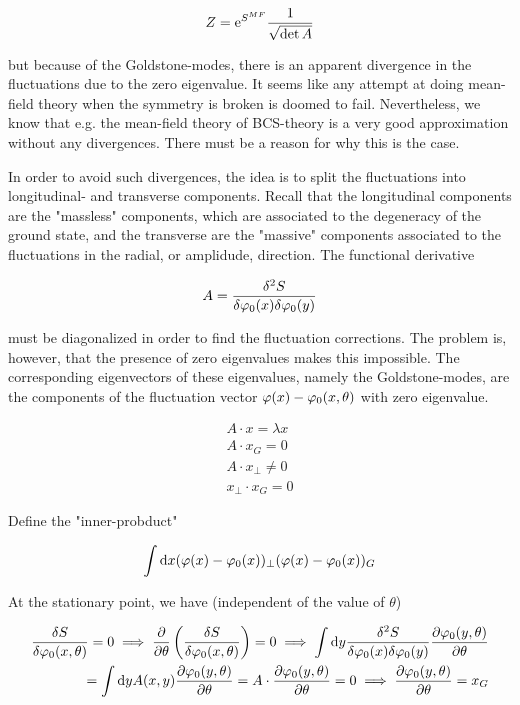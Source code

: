 \begin{align*}
    Z = \mathrm{e}^{S^{MF}} \frac{1}{\sqrt{\det A}}
\end{align*}

but because of the Goldstone-modes, there is an apparent divergence in the fluctuations due to the zero eigenvalue. It seems like any attempt at doing mean-field theory when the symmetry is broken is doomed to fail. Nevertheless, we know that e.g. the mean-field theory of BCS-theory is a very good approximation without any divergences. There must be a reason for why this is the case.  

In order to avoid such divergences, the idea is to split the fluctuations into longitudinal- and transverse components. Recall that the longitudinal components are the "massless" components, which are associated to the degeneracy of the ground state, and the transverse are the "massive" components associated to the fluctuations in the radial, or amplidude, direction. The functional derivative 

\begin{equation*}
    A = \fdv{^2S}{\p_0(x) \delta \p_0(y)}
\end{equation*}

must be diagonalized in order to find the fluctuation corrections. The problem is, however, that the presence of zero eigenvalues makes this impossible. The corresponding eigenvectors of these eigenvalues, namely the Goldstone-modes, are the components of the fluctuation vector $\varphi(x) - \varphi_0(x,\theta)$ with zero eigenvalue.  

\begin{align*}
    A \cdot x = \lambda x \\ 
    A \cdot x_G = 0 \\ 
    A \cdot x_{\perp} \neq 0 \\ 
    x_{\perp} \cdot x_G = 0
\end{align*}

Define the "inner-probduct" 

\begin{align*}
    \int \dd x (\varphi(x) - \varphi_0(x))_{\perp} (\varphi(x) - \varphi_0(x))_G
\end{align*}

At the stationary point, we have (independent of the value of $\theta$) 

\begin{align*}
    \fdv{S}{\p_0(x,\theta)} = 0 \implies \pdv{}{\theta} \left(\fdv{S}{\p_0(x,\theta)}  \right) = 0 
    \implies \int \dd y \fdv{^2S}{\p_0(x) \delta \p_0(y)} \pdv{\p_0(y,\theta)}{\theta} \\ 
    = \int \dd y A(x,y)\pdv{\p_0(y,\theta)}{\theta} = A \cdot \pdv{\p_0(y,\theta)}{\theta} = 0 
    \implies \pdv{\p_0(y,\theta)}{\theta} = x_G
\end{align*}

